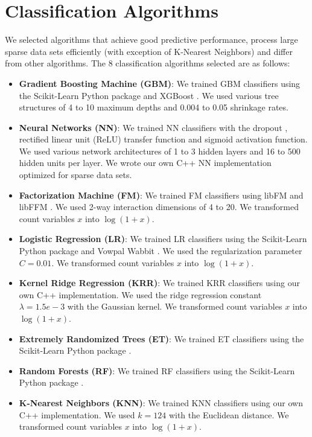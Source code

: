 \section{Classification Algorithms}
We selected algorithms that achieve good predictive performance, process large sparse data sets efficiently (with exception of K-Nearest Neighbors) and differ from other algorithms.  The 8 classification algorithms selected are as follows:
\begin{itemize}
\item \textbf{Gradient Boosting Machine (GBM)}: We trained GBM classifiers using the Scikit-Learn Python package \cite{scikit-learn} and XGBoost \cite{chen2015xgboost}.  We used various tree structures of 4 to 10 maximum depths and 0.004 to 0.05 shrinkage rates.
\item \textbf{Neural Networks (NN)}: We trained NN classifiers with the dropout \cite{srivastava2014dropout}, rectified linear unit (ReLU) \cite{dahl2013improving} transfer function and sigmoid activation function.  We used various network architectures of 1 to 3 hidden layers and 16 to 500 hidden units per layer.  We wrote our own C++ NN implementation optimized for sparse data sets.  
\item \textbf{Factorization Machine (FM)}: We trained FM classifiers using libFM \cite{rendle2012factorization} and libFFM \cite{libffm}.  We used 2-way interaction dimensions of 4 to 20.  We transformed count variables $x$ into $\log{(1 + x)}$.
\item \textbf{Logistic Regression (LR)}: We trained LR classifiers using the Scikit-Learn Python package \cite{scikit-learn} and Vowpal Wabbit \cite{langford2007vowpal}.  We used the regularization parameter $C=0.01$.  We transformed count variables $x$ into $\log{(1 + x)}$.
\item \textbf{Kernel Ridge Regression (KRR)}: We trained KRR classifiers using our own C++ implementation.  We used the ridge regression constant $\lambda=1.5e-3$ with the Gaussian kernel.  We transformed count variables $x$ into $\log{(1 + x)}$.
\item \textbf{Extremely Randomized Trees (ET)}: We trained ET classifiers using the Scikit-Learn Python package \cite{scikit-learn}.
\item \textbf{Random Forests (RF)}: We trained RF classifiers using the Scikit-Learn Python package \cite{scikit-learn}.
\item \textbf{K-Nearest Neighbors (KNN)}: We trained KNN classifiers using our own C++ implementation.  We used $k=124$ with the Euclidean distance.  We transformed count variables $x$ into $\log{(1 + x)}$.
\end{itemize}